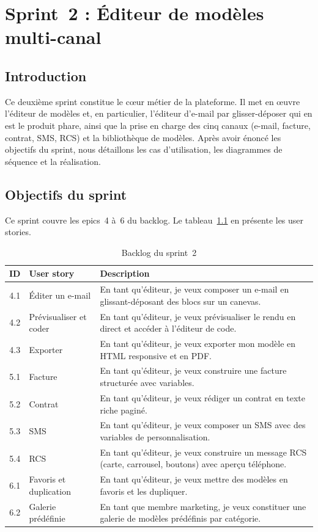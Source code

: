\chapter{Sprint~2 : Éditeur de modèles multi-canal}
\label{chap:sprint2}

\section*{Introduction}
Ce deuxième sprint constitue le c\oe{}ur métier de la plateforme. Il met en
\oe{}uvre l'éditeur de modèles et, en particulier, l'éditeur d'e-mail par
glisser-déposer qui en est le produit phare, ainsi que la prise en charge
des cinq canaux (e-mail, facture, contrat, SMS, RCS) et la bibliothèque de
modèles. Après avoir énoncé les objectifs du sprint, nous détaillons les
cas d'utilisation, les diagrammes de séquence et la réalisation.

\section{Objectifs du sprint}
Ce sprint couvre les epics~4 à~6 du backlog. Le
tableau~\ref{tab:backlog-s2} en présente les user stories.

\begin{table}[H]
\centering
\caption{Backlog du sprint~2}
\label{tab:backlog-s2}
\small
\begin{tabularx}{\linewidth}{clX}
\toprule
\textbf{ID} & \textbf{User story} & \textbf{Description} \\
\midrule
4.1 & Éditer un e-mail & En tant qu'éditeur, je veux composer un e-mail en glissant-déposant des blocs sur un canevas. \\
4.2 & Prévisualiser et coder & En tant qu'éditeur, je veux prévisualiser le rendu en direct et accéder à l'éditeur de code. \\
4.3 & Exporter & En tant qu'éditeur, je veux exporter mon modèle en HTML responsive et en PDF. \\
5.1 & Facture & En tant qu'éditeur, je veux construire une facture structurée avec variables. \\
5.2 & Contrat & En tant qu'éditeur, je veux rédiger un contrat en texte riche paginé. \\
5.3 & SMS & En tant qu'éditeur, je veux composer un SMS avec des variables de personnalisation. \\
5.4 & RCS & En tant qu'éditeur, je veux construire un message RCS (carte, carrousel, boutons) avec aperçu téléphone. \\
6.1 & Favoris et duplication & En tant qu'éditeur, je veux mettre des modèles en favoris et les dupliquer. \\
6.2 & Galerie prédéfinie & En tant que membre marketing, je veux constituer une galerie de modèles prédéfinis par catégorie. \\
\bottomrule
\end{tabularx}
\end{table}

